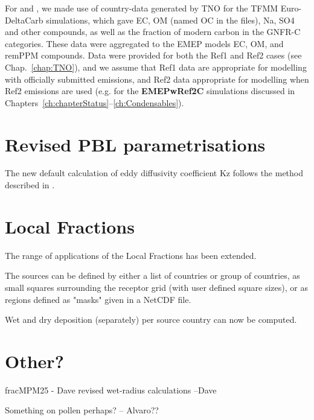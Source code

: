 
For \pmfine and \pmten, we made use of country-data generated by TNO for
the TFMM Euro-DeltaCarb simulations, which gave EC, OM (named
OC in the files), Na, SO4 and other compounds, as well as the fraction
of modern carbon in the GNFR-C categories. These data were aggregated
to the EMEP models EC, OM, and remPPM compounds. Data were provided for
both the Ref1 and Ref2 cases (see Chap.~\ref{chap:TNO}), and we assume
that Ref1 data are appropriate for modelling with officially submitted
emissions, and Ref2 data appropriate for modelling when Ref2 emissions
are used (e.g. for the \textbf{EMEPwRef2C} simulations discussed in
Chapters~\ref{ch:chapterStatus}--\ref{ch:Condensables}).



\section{Revised PBL parametrisations}
\label{sec:updateKz}

The new default calculation of eddy diffusivity coefficient Kz follows the method described in \citet{troenkz}.


\section{Local Fractions}
\label{sec:updateLF}
The range of applications of the Local Fractions has been extended. 

The sources can be defined by either a list of countries or group of countries, as small squares surrounding the receptor grid (with user defined square sizes), or as regions defined as "masks" given in a NetCDF file.

Wet and dry deposition (separately) per source country can now be computed.


\section{Other?}
\label{sec:updateOther}

fracMPM25 - Dave
revised wet-radius calculations --Dave

Something on pollen perhaps? -- Alvaro??



\clearpage
\renewcommand\bibname{References}      %

